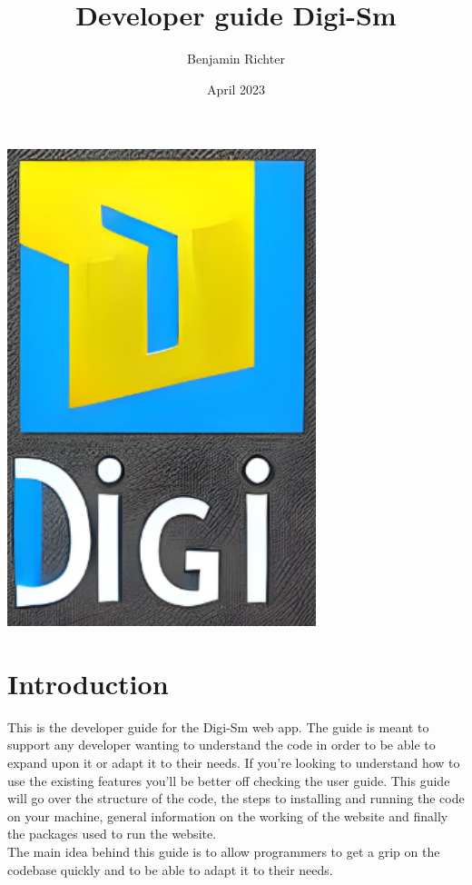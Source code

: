 \documentclass{article}
\title{Developer guide Digi-Sm}
\author{Benjamin Richter}
\date{April 2023}
\begin{document}
\maketitle


\vfill

\begin{center}
    \includegraphics[width=9cm]{logo1.png}
\end{center}



\newpage





\tableofcontents
\clearpage


\section{Introduction}


This is the developer guide for the Digi-Sm web app. The guide is meant to support any developer wanting to understand the code in order to be able to expand upon it or adapt it to their needs. If you're looking to understand how to use the existing features you'll be better off checking the user guide. 
This guide will go over the structure of the code, the steps to installing and running the code on your machine, general information on the working of the website and finally the packages used to run the website.\\
The main idea behind this guide is to allow programmers to get a grip on the codebase quickly and to be able to adapt it to their needs.
\end{document}
